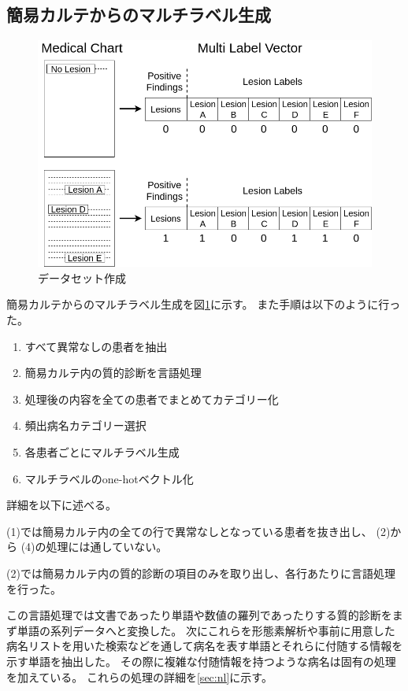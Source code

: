 \subsection{簡易カルテからのマルチラベル生成}

\begin{figure}[htbp]
    \begin{center}
        \includegraphics[width=130mm]{./fig/ieice1.png}
        \caption{データセット作成}
        \label{fig:multilabel}
    \end{center}
\end{figure}

簡易カルテからのマルチラベル生成を図\ref{fig:multilabel}に示す。
また手順は以下のように行った。

\begin{enumerate}
    \item すべて異常なしの患者を抽出
    \item 簡易カルテ内の質的診断を言語処理
    \item 処理後の内容を全ての患者でまとめてカテゴリー化
    \item 頻出病名カテゴリー選択
    \item 各患者ごとにマルチラベル生成
    \item マルチラベルのone-hotベクトル化
\end{enumerate}

詳細を以下に述べる。

 (1)では簡易カルテ内の全ての行で異常なしとなっている患者を抜き出し、 (2)から (4)の処理には通していない。

 (2)では簡易カルテ内の質的診断の項目のみを取り出し、各行あたりに言語処理を行った。

この言語処理では文書であったり単語や数値の羅列であったりする質的診断をまず単語の系列データへと変換した。
次にこれらを形態素解析\cite{MeCab}や事前に用意した病名リストを用いた検索などを通して病名を表す単語とそれらに付随する情報を示す単語を抽出した。
その際に複雑な付随情報を持つような病名は固有の処理を加えている。
これらの処理の詳細を\ref{sec:nl}に示す。

